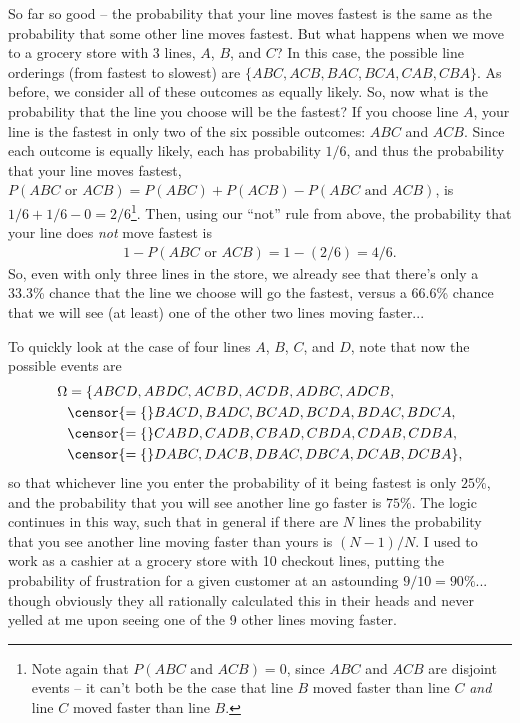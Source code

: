 So far so good -- the probability that your line moves fastest is the same as the probability that some other line moves fastest. But what happens when we move to a grocery store with 3 lines, $A$, $B$, and $C$? In this case, the possible line orderings (from fastest to slowest) are $\{ABC, ACB, BAC, BCA, CAB, CBA\}$. As before, we consider all of these outcomes as equally likely. So, now what is the probability that the line you choose will be the fastest? If you choose line $A$, your line is the fastest in only two of the six possible outcomes: $ABC$ and $ACB$. Since each outcome is equally likely, each has probability $1/6$, and thus the probability that your line moves fastest, $P(ABC\text{ or }ACB) = P(ABC)+P(ACB)-P(ABC\text{ and }ACB)$, is $1/6+1/6-0 = 2/6$\footnote{Note again that $P(ABC\text{ and }ACB) = 0$, since $ABC$ and $ACB$ are disjoint events -- it can't both be the case that line $B$ moved faster than line $C$ \textit{and} line $C$ moved faster than line $B$.}. Then, using our ``not'' rule from above, the probability that your line does \textit{not} move fastest is
\begin{align*}
	1 - P(ABC\text{ or }ACB) = 1 - (2/6) = 4/6.
\end{align*}
So, even with only three lines in the store, we already see that there's only a 33.3\% chance that the line we choose will go the fastest, versus a 66.6\% chance that we will see (at least) one of the other two lines moving faster...

To quickly look at the case of four lines $A$, $B$, $C$, and $D$, note that now the possible events are
\begin{align*}
	\Omega &= \{ABCD, ABDC, ACBD, ACDB, ADBC, ADCB, \\
	&\censor{= \{}BACD, BADC, BCAD, BCDA, BDAC, BDCA, \\
	&\censor{= \{}CABD, CADB, CBAD, CBDA, CDAB, CDBA, \\
	&\censor{= \{}DABC, DACB, DBAC, DBCA, DCAB, DCBA\},
\end{align*}
so that whichever line you enter the probability of it being fastest is only $25\%$, and the probability that you will see another line go faster is $75\%$. The logic continues in this way, such that in general if there are $N$ lines the probability that you see another line moving faster than yours is $(N-1)/N$. I used to work as a cashier at a grocery store with 10 checkout lines, putting the probability of frustration for a given customer at an astounding $9/10 = 90\%$... though obviously they all rationally calculated this in their heads and never yelled at me upon seeing one of the 9 other lines moving faster.

